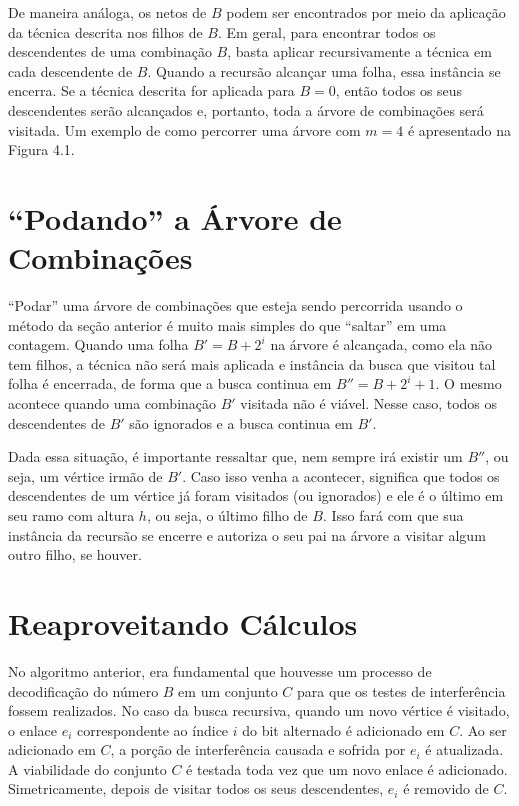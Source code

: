 De maneira análoga, os netos de $B$ podem ser encontrados por meio da aplicação da técnica descrita nos filhos de $B$. Em geral, para encontrar todos os descendentes de uma combinação $B$, basta aplicar recursivamente a técnica em cada descendente de $B$. Quando a recursão alcançar uma folha, essa instância se encerra. Se a técnica descrita for aplicada para $B=0$, então todos os seus descendentes serão alcançados e, portanto, toda a árvore de combinações será visitada. Um exemplo de como percorrer uma árvore com $m=4$ é apresentado na Figura 4.1.


\section{“Podando” a Árvore de Combinações}

“Podar” uma árvore de combinações que esteja sendo percorrida usando o método da seção anterior é muito mais simples do que “saltar” em uma contagem. Quando uma folha $B' = B + 2^i$ na árvore é alcançada, como ela não tem filhos, a técnica não será mais aplicada e instância da busca que visitou tal folha é encerrada, de forma que a busca continua em $B''=B+2^i+1$. O mesmo acontece quando uma combinação $B'$ visitada não é viável. Nesse caso, todos os descendentes de $B'$ são ignorados e a busca continua em $B'$.

Dada essa situação, é importante ressaltar que, nem sempre irá existir um $B''$, ou seja, um vértice irmão de $B'$. Caso isso venha a acontecer, significa que todos os descendentes de um vértice já foram visitados (ou ignorados) e ele é o último em seu ramo com altura $h$, ou seja, o último filho de $B$. Isso fará com que sua instância da recursão se encerre e autoriza o seu pai na árvore a visitar algum outro filho, se houver. 

\section{Reaproveitando Cálculos}

No algoritmo anterior, era fundamental que houvesse um processo de decodificação do número $B$ em um conjunto $C$ para que os testes de interferência fossem realizados. No caso da busca recursiva, quando um novo vértice é visitado, o enlace $e_i$ correspondente ao índice $i$ do bit alternado é adicionado em $C$. Ao ser adicionado em $C$, a porção de interferência causada e sofrida por $e_i$ é atualizada. A viabilidade do conjunto $C$ é testada toda vez que um novo enlace é adicionado. Simetricamente, depois de visitar todos os seus descendentes, $e_i$ é removido de $C$.

